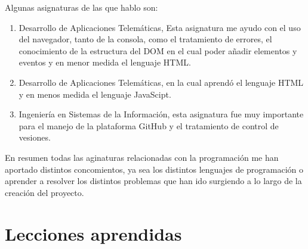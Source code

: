 \documentclass[a4paper, 12pt]{book}
\begin{document}
Algunas asignaturas de las que hablo son:
\begin{enumerate}
  \item Desarrollo de Aplicaciones Telemáticas, Esta asignatura me ayudo con el uso del navegador, tanto de la consola, como el tratamiento de errores, el conocimiento de la estructura del DOM en el cual poder añadir elementos y eventos y en menor medida el lenguaje HTML.
  \item Desarrollo de Aplicaciones Telemáticas, en la cual aprendó el lenguaje HTML y en menos medida el lenguaje JavaScipt.
  \item Ingeniería en Sistemas de la Información, esta asignatura fue muy importante para el manejo de la plataforma GitHub y el tratamiento de control de vesiones.
\end{enumerate}
En resumen todas las aginaturas relacionadas con la programación me han aportado distintos concomientos, ya sea los distintos lenguajes de programación o aprender a resolver los distintos problemas que han ido surgiendo a lo largo de la creación del proyecto.

\section{Lecciones aprendidas}
\label{sec:lecciones_aprendidas}
\end{document}
